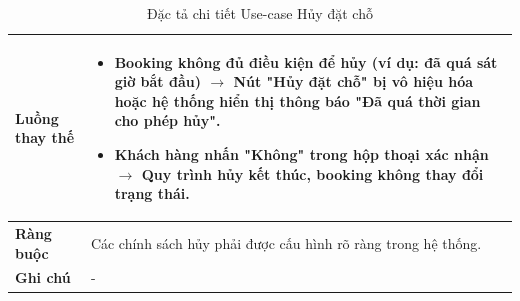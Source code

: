 \begin{table}[H]
\begin{tabular}{|p{4cm}|p{10cm}|}
\textbf{Luồng thay thế} 
& 
\begin{itemize}
    \item Booking không đủ điều kiện để hủy (ví dụ: đã quá sát giờ bắt đầu) $\rightarrow$ Nút "Hủy đặt chỗ" bị vô hiệu hóa hoặc hệ thống hiển thị thông báo "Đã quá thời gian cho phép hủy".
    \item Khách hàng nhấn "Không" trong hộp thoại xác nhận $\rightarrow$ Quy trình hủy kết thúc, booking không thay đổi trạng thái.
\end{itemize} \\ 
\hline

\textbf{Ràng buộc} 
& Các chính sách hủy phải được cấu hình rõ ràng trong hệ thống. \\ 
\hline

\textbf{Ghi chú} 
& - \\ 
\hline
\end{tabular}
\caption{Đặc tả chi tiết Use-case Hủy đặt chỗ}
\label{tab:cancel-spec}
\end{table}


